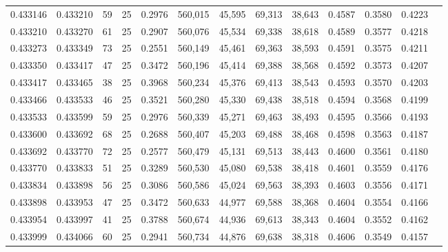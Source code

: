 \begin{tabular}{rrrrrrrrrrrrr}
0.433146 & 0.433210 &    59 &  25 &                                     0.2976 & 560,015 &  45,595 &  69,313 &  38,643 & 0.4587 & 0.3580 & 0.4223 \\
0.433210 & 0.433270 &    61 &  25 &                                     0.2907 & 560,076 &  45,534 &  69,338 &  38,618 & 0.4589 & 0.3577 & 0.4218 \\
0.433273 & 0.433349 &    73 &  25 &                                     0.2551 & 560,149 &  45,461 &  69,363 &  38,593 & 0.4591 & 0.3575 & 0.4211 \\
0.433350 & 0.433417 &    47 &  25 &                                     0.3472 & 560,196 &  45,414 &  69,388 &  38,568 & 0.4592 & 0.3573 & 0.4207 \\
0.433417 & 0.433465 &    38 &  25 &                                     0.3968 & 560,234 &  45,376 &  69,413 &  38,543 & 0.4593 & 0.3570 & 0.4203 \\
0.433466 & 0.433533 &    46 &  25 &                                     0.3521 & 560,280 &  45,330 &  69,438 &  38,518 & 0.4594 & 0.3568 & 0.4199 \\
0.433533 & 0.433599 &    59 &  25 &                                     0.2976 & 560,339 &  45,271 &  69,463 &  38,493 & 0.4595 & 0.3566 & 0.4193 \\
0.433600 & 0.433692 &    68 &  25 &                                     0.2688 & 560,407 &  45,203 &  69,488 &  38,468 & 0.4598 & 0.3563 & 0.4187 \\
0.433692 & 0.433770 &    72 &  25 &                                     0.2577 & 560,479 &  45,131 &  69,513 &  38,443 & 0.4600 & 0.3561 & 0.4180 \\
0.433770 & 0.433833 &    51 &  25 &                                     0.3289 & 560,530 &  45,080 &  69,538 &  38,418 & 0.4601 & 0.3559 & 0.4176 \\
0.433834 & 0.433898 &    56 &  25 &                                     0.3086 & 560,586 &  45,024 &  69,563 &  38,393 & 0.4603 & 0.3556 & 0.4171 \\
0.433898 & 0.433953 &    47 &  25 &                                     0.3472 & 560,633 &  44,977 &  69,588 &  38,368 & 0.4604 & 0.3554 & 0.4166 \\
0.433954 & 0.433997 &    41 &  25 &                                     0.3788 & 560,674 &  44,936 &  69,613 &  38,343 & 0.4604 & 0.3552 & 0.4162 \\
0.433999 & 0.434066 &    60 &  25 &                                     0.2941 & 560,734 &  44,876 &  69,638 &  38,318 & 0.4606 & 0.3549 & 0.4157 \\

\end{tabular}
